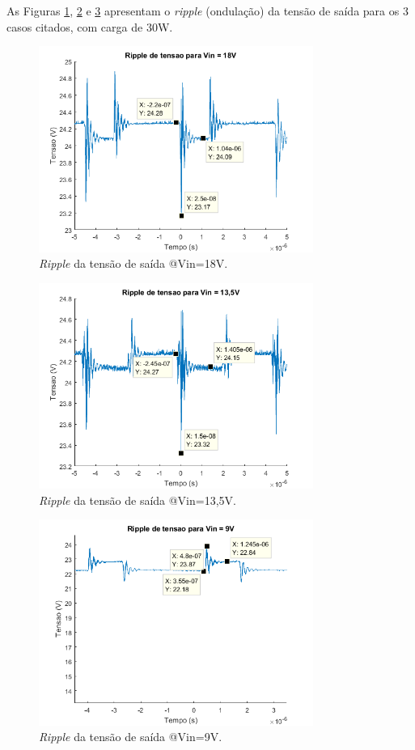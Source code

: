 \documentclass[a4paper]{article}
\begin{document}
{As Figuras \ref{fig:ripple-18V}, \ref{fig:ripple-13v5} e \ref{fig:ripple-9V} apresentam o \emph{ripple} (ondulação) da tensão de saída para os 3 casos citados, com carga de 30W.
\FloatBarrier
\begin{figure}[H]
	\centering
	\includegraphics[width=0.8\textwidth]{ripple-vin-18V.png}
	\caption{\emph{Ripple} da tensão de saída @Vin=18V.}
	\label{fig:ripple-18V}
\end{figure}
\FloatBarrier
\begin{figure}[H]
	\centering
	\includegraphics[width=0.8\textwidth]{ripple-vin-13V5.png}
	\caption{\emph{Ripple} da tensão de saída @Vin=13,5V.}
	\label{fig:ripple-13v5}
\end{figure}
\FloatBarrier
\begin{figure}[H]
	\centering
	\includegraphics[width=0.8\textwidth]{ripple-vin-9V.png}
	\caption{\emph{Ripple} da tensão de saída @Vin=9V.}
	\label{fig:ripple-9V}
\end{figure}
\FloatBarrier
}
\end{document}
